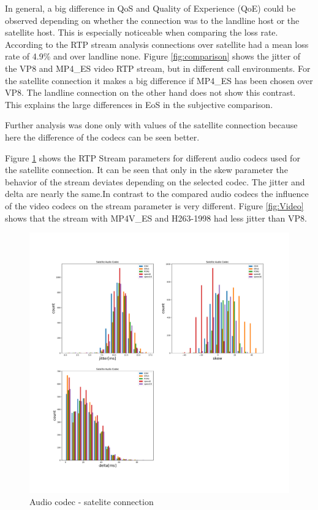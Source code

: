 \documentclass[parskip=full]{scrartcl}
\begin{document}
In general, a big difference in QoS and Quality of Experience (QoE) could be observed depending on whether the connection was to the landline host or the satellite host.
This is especially noticeable when comparing the loss rate.
According to the RTP stream analysis connections over satellite had a mean loss rate of 4.9\% and over landline none. 
Figure \ref{fig:comparison} shows the jitter of the VP8 and MP4\_ES video RTP stream, but in different call environments. 
For the satellite connection it makes a big difference if MP4\_ES has been chosen over VP8. 
The landline connection on the other hand does not show this contrast.
This explains the large differences in EoS in the subjective comparison.

Further analysis was done only with values of the satellite connection because here the difference of the codecs can be seen better.

Figure \ref{fig:Audio} shows the RTP Stream parameters for different audio codecs used for the satellite connection. 
It can be seen that only in the skew parameter the behavior of the stream deviates depending on the selected codec.
The jitter and delta are nearly the same.In contrast to the compared audio codecs the influence of the video codecs on the stream parameter is very different. Figure \ref{fig:Video} shows that the stream with MP4V\_ES and H263-1998 had less jitter than VP8.



\begin{figure}[!ht]
	\centering %
	\includegraphics[width=\textwidth]{images/satelite-audio-histogram.pdf} %
	\caption{Audio codec - satelite connection} 
	\label{fig:Audio} %
\end{figure}
\end{document}
